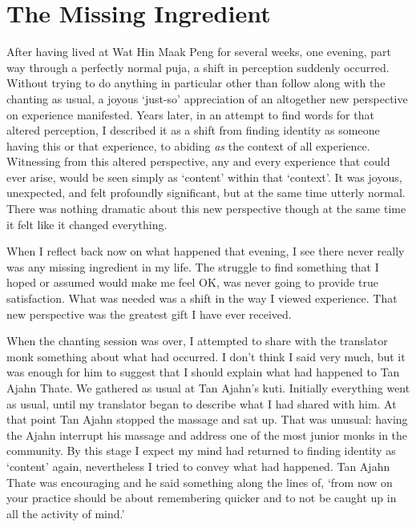 \chapter{The Missing Ingredient}

After having lived at Wat Hin Maak Peng for several weeks, one evening,
part way through a perfectly normal puja, a shift in perception suddenly
occurred. Without trying to do anything in particular other than follow
along with the chanting as usual, a joyous `just-so' appreciation of an
altogether new perspective on experience manifested. Years later, in an
attempt to find words for that altered perception, I described it as a
shift from finding identity as someone having this or that experience,
to abiding \emph{as} the context of all experience. Witnessing from this
altered perspective, any and every experience that could ever arise,
would be seen simply as `content' within that `context'. It was joyous,
unexpected, and felt profoundly significant, but at the same time
utterly normal. There was nothing dramatic about this new perspective
though at the same time it felt like it changed everything.

When I reflect back now on what happened that evening, I see there never
really was any missing ingredient in my life. The struggle to find
something that I hoped or assumed would make me feel OK, was never going
to provide true satisfaction. What was needed was a shift in the way I
viewed experience. That new perspective was the greatest gift I have
ever received.

When the chanting session was over, I attempted to share with the
translator monk something about what had occurred. I don't think I said
very much, but it was enough for him to suggest that I should explain
what had happened to Tan Ajahn Thate. We gathered as usual at Tan
Ajahn's kuti. Initially everything went as usual, until my translator
began to describe what I had shared with him. At that point Tan Ajahn
stopped the massage and sat up. That was unusual: having the Ajahn
interrupt his massage and address one of the most junior monks in the
community. By this stage I expect my mind had returned to finding
identity as `content' again, nevertheless I tried to convey what had
happened. Tan Ajahn Thate was encouraging and he said something along the
lines of, `from now on your practice should be about remembering quicker
and to not be caught up in all the activity of mind.'

